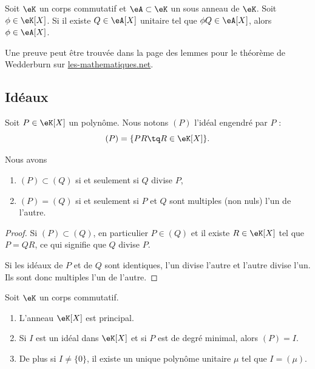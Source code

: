 \begin{lemma}   \label{LemzwkYdn}
    Soit \( \eK\) un corps commutatif et \( \eA\subset \eK\) un sous anneau de \( \eK\). Soit \( \phi\in \eK[X]\). Si il existe \( Q\in \eA[X]\) unitaire tel que \( \phi Q\in \eA[X]\), alors \( \phi\in \eA[X]\).
\end{lemma}
Une preuve peut être trouvée dans la page des lemmes pour le théorème de Wedderburn sur \href{http://www.les-mathematiques.net/d/a/w/node5.php}{les-mathematiques.net}.

\subsection{Idéaux}

Soit \( P\in \eK[X]\) un polynôme. Nous notons \( (P)\) l'idéal engendré par \( P\) :
\begin{equation}        \label{EqDefxMkDtW}
    (P)=\{ PR\tq R\in\eK[X] \}.
\end{equation}

\begin{lemma}
    Nous avons
    \begin{enumerate}
        \item
            \( (P)\subset (Q)\) si et seulement si \( Q\) divise \( P\),
        \item
            \( (P)=(Q)\) si et seulement si \( P\) et \( Q\) sont multiples (non nuls) l'un de l'autre.
    \end{enumerate}
\end{lemma}

\begin{proof}
    Si \( (P)\subset (Q)\), en particulier \( P\in(Q)\) et il existe \( R\in\eK[X]\) tel que \( P=QR\), ce qui signifie que \( Q\) divise \( P\).

    Si les idéaux de \( P\) et de \( Q\) sont identiques, l'un divise l'autre et l'autre divise l'un. Ils sont donc multiples l'un de l'autre.
\end{proof}

\begin{theorem}     \label{ThoCCHkoU}
    Soit \( \eK\) un corps commutatif.
    \begin{enumerate}
        \item
            L'anneau \( \eK[X]\) est principal. 
        \item
            Si \( I\) est un idéal dans \( \eK[X]\) et si \( P\) est de degré minimal, alors \( (P)=I\).
        \item
            De plus si \( I\neq \{  0\}\), il existe un unique polynôme unitaire \( \mu\) tel que \( I=(\mu)\).
    \end{enumerate}
\end{theorem}

